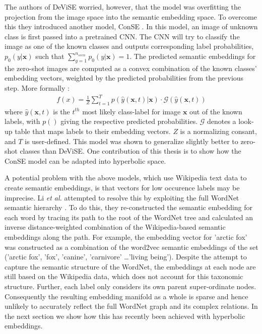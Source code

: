 \documentclass[12pt]{report}
\begin{document}
The authors of DeViSE worried, however, that the model was overfitting the projection from the image space into the semantic embedding space. To overcome this they introduced another model, ConSE \cite{Norouzi2013}. In this model, an image of unknown class is first passed into a pretrained CNN. The CNN will try to classify the image as one of the known classes and outputs corresponding label probabilities, $p_0 (y | \mathbf{x})$ such that $\sum_{y=1}^{n_{seen}} p_0 (y | \mathbf{x}) = 1$. The predicted semantic embeddings for the zero-shot images are computed as a convex combination of the known classes' embedding vectors, weighted by the predicted probabilities from the previous step. More formally \cite{Norouzi2013}:
\begin{align}
  f(x) = \frac{1}{Z}\sum_{t=1}^T p(\hat{y}(\mathbf{x}, t)| \mathbf{x}) \cdot \mathcal{G}(\hat{y}(\mathbf{x}, t))
\end{align}
where $\hat{y}(\mathbf{x}, t)$ is the $t^{th}$ most likely class-label for image $\mathbf{x}$ out of the known labels, with $p()$ giving the respective predicted probabilities. $\mathcal{G}$ denotes a look-up table that maps labels to their embedding vectors. $Z$ is a normalizing consant, and $T$ is user-defined. This model was shown to generalize slightly better to zero-shot classes than DeViSE. One contribution of this thesis is to show how the ConSE model can be adapted into hyperbolic space.

A potential problem with the above models, which use Wikipedia text data to create semantic embeddings, is that vectors for low occurence labels may be imprecise. Li \textit{et al.} \cite{Li2015} attempted to resolve this by exploiting the full WordNet semantic hierarchy \cite{Miller1995}. To do this, they re-constructed the semantic embedding for each word by tracing its path to the root of the WordNet tree and calculated an inverse distance-weighted combination of the Wikipedia-based semantic embeddings along the path. For example, the embedding vector for 'arctic fox' was constructed as a combination of the word2vec semantic embeddings of the set ('arctic fox', 'fox', 'canine', 'carnivore' \dots 'living being'). Despite the attempt to capture the semantic structure of the WordNet, the embeddings at each node are still based on the Wikipedia data, which does not account for this taxonomic structure. Further, each label only considers its own parent super-ordinate nodes. Consequently the resulting embedding manifold as a whole is sparse and hence unlikely to accurately reflect the full WordNet graph and its complex relations. In the next section we show how this has recently been achieved with hyperbolic embeddings.
\end{document}
